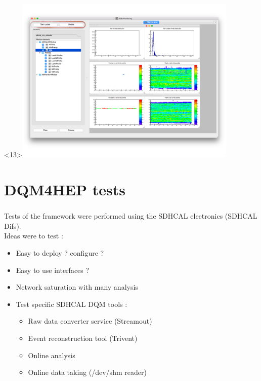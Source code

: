 \documentclass[8pt]{beamer}
\begin{document}
\begin{frame}
\begin{overlayarea}{\textwidth}{\textheight}
\begin{center}
         \begin{onlyenv}<13>\includegraphics[width=0.8\textwidth]{figs/MonitoringGui/MG_AutoUpdate.png}\end{onlyenv}
      \end{center}
    \end{overlayarea}
    
  \end{frame}
    
    
    
  
  \section{DQM4HEP tests}

  \begin{frame}
  \frametitle{\secname}

  Tests of the framework were performed using the SDHCAL electronics (SDHCAL Difs). \\
  Ideas were to test : \\
  
  \begin{itemize}
    \item Easy to deploy ? configure ?
    \item Easy to use interfaces ?
    \item Network saturation with many analysis
    \item Test specific SDHCAL DQM tools :
    \begin{itemize}
      \item Raw data converter service (Streamout)
      \item Event reconstruction tool (Trivent)
      \item Online analysis
      \item Online data taking (/dev/shm reader)
    \end{itemize}
  \end{itemize}
  
  \end{frame}
  
\end{document}
